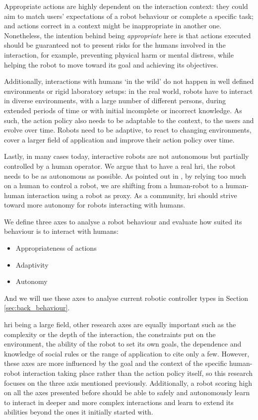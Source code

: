     Appropriate actions are highly dependent on the interaction context: they could aim to match users' expectations of a robot behaviour or complete a specific task; and actions correct in a context might be inappropriate in another one. Nonetheless, the intention behind being \textit{appropriate} here is that actions executed should be guaranteed not to present risks for the humans involved in the interaction, for example, preventing physical harm or mental distress, while helping the robot to move toward its goal and achieving its objectives.

    Additionally, interactions with humans `in the wild' \citep{belpaeme2012multimodal} do not happen in well defined environments or rigid laboratory setups: in the real world, robots have to interact in diverse environments, with a large number of different persons, during extended periods of time or with initial incomplete or incorrect knowledge. As such, the action policy also needs to be adaptable to the context, to the users and evolve over time. Robots need to be adaptive, to react to changing environments, cover a larger field of application and improve their action policy over time.

    Lastly, in many cases today, interactive robots are not autonomous but partially controlled by a human operator. We argue that to have a real \gls{hri}, the robot needs to be as autonomous as possible. As pointed out in \citet{baxter2016characterising}, by relying too much on a human to control a robot, we are shifting from a human-robot to a human-human interaction using a robot as proxy. As a community, \gls{hri} should strive toward more autonomy for robots interacting with humans.
    
    We define three axes to analyse a robot behaviour and evaluate how suited its behaviour is to interact with humans:
    \begin{itemize}
    	\item Appropriateness of actions
    	\item Adaptivity
    	\item Autonomy
    \end{itemize}
    And we will use these axes to analyse current robotic controller types in Section \ref{sec:back_behaviour}.    
    
    \gls{hri} being a large field, other research axes are equally important such as the complexity or the depth of the interaction, the constraints put on the environment, the ability of the robot to set its own goals, the dependence and knowledge of social rules or the range of application to cite only a few. However, these axes are more influenced by the goal and the context of the specific human-robot interaction taking place rather than the action policy itself, so this research focuses on the three axis mentioned previously. Additionally, a robot scoring high on all the axes presented before should be able to safely and autonomously learn to interact in deeper and more complex interactions and learn to extend its abilities beyond the ones it initially started with.

